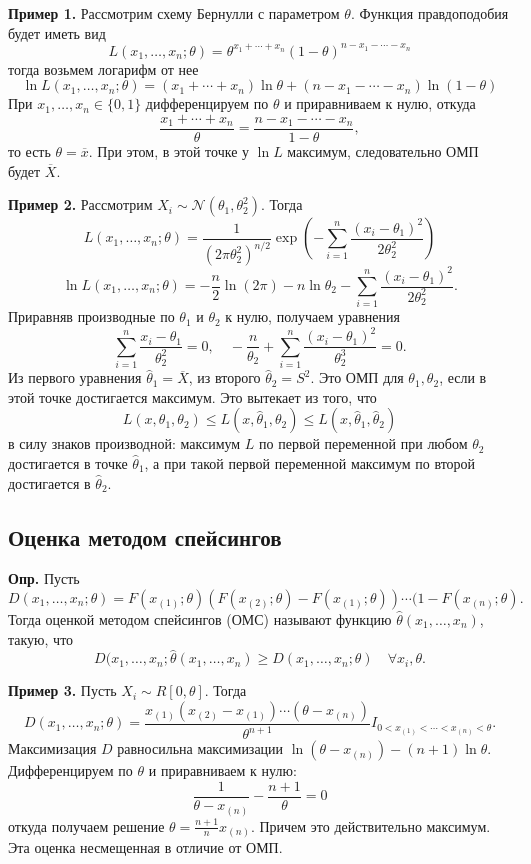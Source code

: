 \documentclass[a4paper,12pt]{article}
\newcommand{\thetah}{\hat\theta}
\newcommand{\bX}{\overline X}
\renewcommand{\ge}{\geqslant}
\renewcommand{\le}{\leqslant}
\newcommand{\braces}[1]{\left(#1\right)}
\newcounter{th-counter}
\newcounter{df-counter}
\newcommand{\df}{\par\noindent%
	\textbf{Опр. } }
\begin{document}
\noindent\textbf{Пример 1.} Рассмотрим схему Бернулли с параметром $\theta$. Функция правдоподобия будет иметь вид
$$L(x_1, \ldots, x_n; \theta) = \theta^{x_1 + \cdots + x_n} (1- \theta)^{n-x_1-\cdots - x_n}$$
тогда возьмем логарифм от нее
$$\ln L(x_1, \ldots, x_n; \theta) = (x_1 + \cdots + x_n) \ln \theta + (n - x_1 - \cdots - x_n) \ln(1-\theta)$$
При $x_1, \ldots, x_n \in \{0,1\}$ дифференцируем по $\theta$ и приравниваем к нулю, откуда
$$\frac{x_1 + \cdots + x_n}{\theta} = \frac{n - x_1 - \cdots - x_n}{1 - \theta},$$
то есть $\theta = \overline{x}$. При этом, в этой точке у $\ln L$ максимум, следовательно ОМП будет $\bX$.

\noindent\textbf{Пример 2.} Рассмотрим $X_i \sim \mathcal{N}(\theta_1, \theta_2^2)$. Тогда
$$L(x_1, \ldots, x_n; \theta) = \frac{1}{(2\pi \theta_2^2)^{n/2}} \exp\braces{-\sum_{i=1}^n \frac{(x_i - \theta_1)^2}{2\theta_2^2}}$$
$$\ln L(x_1, \ldots, x_n; \theta) = -\frac{n}{2} \ln (2\pi) - n\ln \theta_2 - \sum_{i=1}^n \frac{(x_i - \theta_1)^2}{2\theta_2^2}.$$
Приравняв производные по $\theta_1$ и $\theta_2$ к нулю, получаем уравнения
$$\sum_{i=1}^n \frac{x_i-\theta_1}{\theta_2^2} = 0, \quad -\frac{n}{\theta_2} + \sum_{i=1}^n \frac{(x_i - \theta_1)^2}{\theta_2^3} = 0.$$
Из первого уравнения $\thetah_1 = \bX$, из второго $\thetah_2 = S^2$. Это ОМП для $\theta_1, \theta_2$, если в этой точке достигается максимум. Это вытекает из того, что
$$L(x, \theta_1, \theta_2) \le L(x, \thetah_1, \theta_2) \le L(x, \thetah_1, \thetah_2)$$
в силу знаков производной: максимум $L$ по первой переменной при любом $\theta_2$ достигается в точке $\thetah_1$, а при такой первой переменной максимум по второй достигается в $\thetah_2$.

\subsection*{Оценка методом спейсингов}

\df Пусть
$$D(x_1, \ldots, x_n; \theta) = F(x_{(1)}; \theta) (F(x_{(2)}; \theta) - F(x_{(1)}; \theta)) \cdots (1 - F(x_{(n)};\theta).$$
Тогда оценкой методом спейсингов (ОМС) называют функцию $\thetah(x_1, \ldots, x_n)$, такую, что
\[
D(x_1, \ldots, x_n; \thetah(x_1, \ldots, x_n) \ge D(x_1, \ldots, x_n; \theta) \quad \forall x_i, \theta.
\]

\noindent\textbf{Пример 3.} Пусть $X_i \sim R[0, \theta]$. Тогда
\[
D(x_1, \ldots, x_n; \theta) = \frac{x_{(1)} (x_{(2)} - x_{(1)}) \cdots (\theta - x_{(n)})}{\theta^{n+1}} I_{0 < x_{(1)} < \cdots < x_{(n)} < \theta}.
\]
Максимизация $D$ равносильна максимизации $\ln (\theta - x_{(n)}) - (n+1) \ln \theta$. Дифференцируем по $\theta$ и приравниваем к нулю:
\[
\frac{1}{\theta - x_{(n)}} - \frac{n+1}{\theta} = 0
\]
откуда получаем решение $\theta = \frac{n+1}{n}x_{(n)}$. Причем это действительно максимум. Эта оценка несмещенная в отличие от ОМП.
\end{document}
